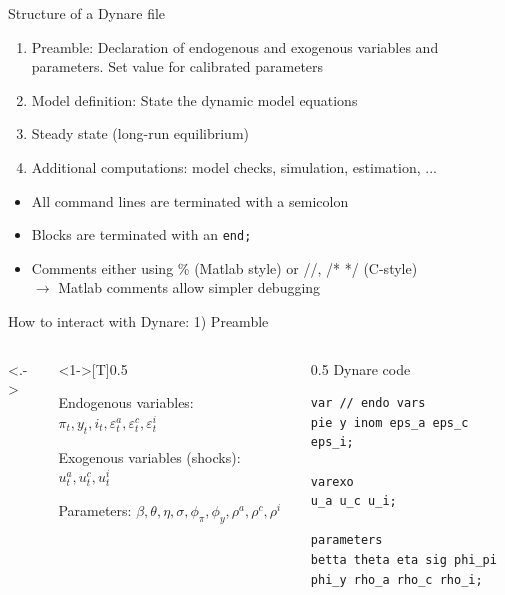 \documentclass[handout,usepdftitle=false,xcolor=dvipsnames,aspectratio=169]{beamer}
\begin{document}
\begin{frame}{Structure of a Dynare file}
\begin{figure}
\end{figure}
\begin{enumerate}
\item Preamble: Declaration of endogenous and exogenous variables and parameters. Set value for calibrated parameters
\item Model definition: State the dynamic model equations
\item Steady state (long-run equilibrium)
\item Additional computations: model checks,  simulation, estimation, ...
\end{enumerate}
\begin{itemize}
\item All command lines are terminated with a semicolon
\item Blocks are terminated with an \texttt{end;}
\item Comments either using \% (Matlab style) or //, /* */ (C-style)\\
$\rightarrow$ Matlab comments allow simpler debugging
\end{itemize}
\end{frame}

\begin{frame}[fragile]{How to interact with Dynare: 1) Preamble}
\begin{columns}<.->
\begin{column}<1->[T]{0.5\textwidth}
	    \begin{witemize}
	        \item Endogenous variables: $\pi_t, y_t, i_t, \varepsilon_t^a, \varepsilon_t^c, \varepsilon_t^i$
	        \item Exogenous variables (shocks): $u_t^a, u_t^c, u_t^i$
	        \item Parameters: $ \beta, \theta, \eta, \sigma,\phi_\pi,\phi_y,\rho^a,\rho^c,\rho^i $
	    \end{witemize}
\end{column}
\begin{column}[T]{0.5\textwidth}
Dynare code
\begin{verbatim}
var // endo vars
pie y inom eps_a eps_c eps_i;

varexo
u_a u_c u_i;

parameters
betta theta eta sig phi_pi
phi_y rho_a rho_c rho_i;
\end{verbatim}
\end{column}
\end{columns}
\end{frame}
\end{document}
